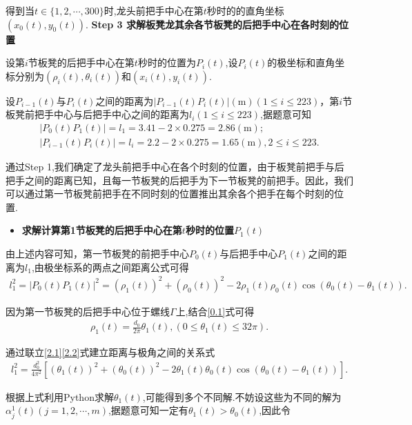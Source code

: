 \documentclass{cumcmthesis}
\begin{document}
        \par 得到当\(t\in \{ 1,2,\cdots ,300 \}\)时,龙头前把手中心在第\(t\)秒时的的直角坐标\((x_0(t),y_0(t))\).
        \textbf{Step 3 求解板凳龙其余各节板凳的后把手中心在各时刻的位置}
    \par 设第\(i\)节板凳的后把手中心在第\(t\)秒时的位置为\(P_{i}(t)\),设\(P_{i}(t)\)的极坐标和直角坐标分别为\((\rho _{i}(t),\theta _{i}(t))\)和\((x_{i}(t),y_{i}(t))\).
    \par 设\(P_{i-1}(t)\)与\(P_{i}(t)\)之间的距离为\(| P_{i-1}(t)P_{i}(t)|(\mathrm{m}) (1\leqslant i\leqslant 223)\)，第$i$节板凳前把手中心与后把手中心之间的距离为\(l_i(1\leq i\leq 223)\),据题意可知
\begin{gather}\label{1.........4}
| P_0(t)P_1(t)| = l_1 = 3.41 - 2\times 0.275 = 2.86(\mathrm{m});
\\
| P_{i-1}(t)P_{i}(t)| = l_i = 2.2 - 2\times 0.275 = 1.65(\mathrm{m}),2\leqslant i\leqslant 223.
\end{gather}
\par 通过Step 1,我们确定了龙头前把手中心在各个时刻的位置，由于板凳前把手与后把手之间的距离已知，且每一节板凳的后把手为下一节板凳的前把手。因此，我们可以通过第一节板凳前把手在不同时刻的位置推出其余各个把手在每个时刻的位置.
\begin{itemize}
\item \textbf{求解计算第1节板凳的后把手中心在第\(t\)秒时的位置\(P_1(t)\)}
\end{itemize}
\par 由上述内容可知，第一节板凳的前把手中心$P_0(t)$与后把手中心$P_1(t)$之间的距离为$l_{1}$,由极坐标系的两点之间距离公式可得
\begin{align}
l_{1}^{2}=| P_0(t)P_1(t)|^2=(\rho _1(t))^2+(\rho _0(t))^2 - 2\rho _1(t)\rho _0(t)\cos (\theta _0(t)-\theta _1(t)) .\label{2.1} 
\end{align}
\par 因为第一节板凳的后把手中心位于螺线\(\varGamma\)上,结合\eqref{0.1}式可得
\begin{align}
\rho _1(t)=\frac{d_0}{2\pi}\theta _1(t),(0\leqslant \theta _1(t)\leqslant 32\pi) .\label{2.2}
\end{align}
\par 通过联立\eqref{2.1}\eqref{2.2}式建立距离与极角之间的关系式
\begin{align}
l_{1}^{2}=\frac{d_{0}^{2}}{4\pi ^2}[(\theta _1(t))^2+(\theta _0(t))^2 - 2\theta _1(t)\theta _0(t)\cos (\theta _0(t)-\theta _1(t))] .\label{2.0}
\end{align}
\par 根据上式利用Python求解\(\theta _1(t)\),可能得到多个不同解.不妨设这些为不同的解为\(\alpha _{j}^{1}(t) (j = 1,2,\cdots ,m)\),据题意可知一定有\(\theta _1(t)>\theta _0(t)\),因此令
\end{document}
